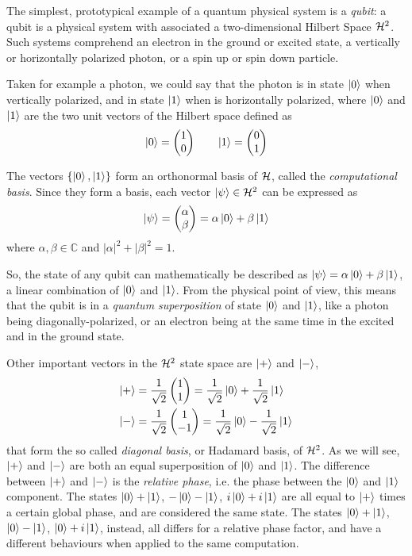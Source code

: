 The simplest, prototypical example of a quantum physical system is a \textit{qubit}: a qubit is a physical system with associated a two-dimensional Hilbert Space $\mathcal{H}^2$. Such systems comprehend an electron in the ground or excited state, a vertically or horizontally polarized photon, or a spin up or spin down particle.

Taken for example a photon, we could say that the photon is in state $\ket{0}$ when vertically polarized, and in state $\ket{1}$ when is horizontally polarized, where $\ket{0}$ and $\ket{1}$ are the two unit vectors of the Hilbert space defined as
\[
	\ket{0} = \begin{pmatrix}
	1 \\
	0
	\end{pmatrix} \qquad
	\ket{1} = \begin{pmatrix}
	0 \\
	1
	\end{pmatrix}
\]

The vectors $\{\ket{0}, \ket{1}\}$ form an orthonormal basis of $\mathcal{H}$, called the \textit{computational basis}. Since they form a basis, each vector $\ket{\psi} \in \mathcal{H}^2$ can be expressed as 
	\[\ket{\psi} = \begin{pmatrix}
	\alpha \\
	\beta
	\end{pmatrix} = 
	\alpha\ket{0} + \beta\ket{1}
	\]
where $\alpha, \beta \in \mathbb{C}$ and $|\alpha|^2 + |\beta|^2 = 1$.

So, the state of any qubit can mathematically be described as $\ket{\psi} = \alpha\ket{0} +\beta\ket{1}$, a linear combination of $\ket{0}$ and $\ket{1}$. From the physical point of view, this means that the qubit is in a \textit{quantum superposition} of state $\ket{0}$ and $\ket{1}$, like a photon being diagonally-polarized, or an electron being at the same time in the excited and in the ground state.

Other important vectors in the $\mathcal{H}^2$ state space are $\ket{+}$ and $\ket{-}$,
\begin{align*}
	\ket{+} = \frac{1}{\sqrt{2}} &\begin{pmatrix}
	1 \\
	1
	\end{pmatrix}  = \frac{1}{\sqrt{2}}\ket{0} + \frac{1}{\sqrt{2}}\ket{1}   \\
	\ket{-}  = \frac{1}{\sqrt{2}} &\begin{pmatrix}
	1 \\
	-1
	\end{pmatrix}  = \frac{1}{\sqrt{2}}\ket{0} - \frac{1}{\sqrt{2}}\ket{1} 
\end{align*}
that form the so called \textit{diagonal basis}, or Hadamard basis, of $\mathcal{H}^2$. As we will see, $\ket{+}$ and $\ket{-}$ are both an equal superposition of $\ket{0}$ and $\ket{1}$. The difference between $\ket{+}$ and $\ket{-}$ is the \textit{relative phase}, i.e. the phase between the $\ket{0}$ and $\ket{1}$ component. The states $\ket{0} + \ket{1}$, $-\ket{0} -\ket{1}$, $i\ket{0} + i\ket{1}$ are all equal to $\ket{+}$ times a certain global phase, and are considered the same state. The states $\ket{0} + \ket{1}$, $\ket{0} - \ket{1}$, $\ket{0} +i\ket{1}$, instead, all differs for a relative phase factor, and have a different behaviours when applied to the same computation. 
